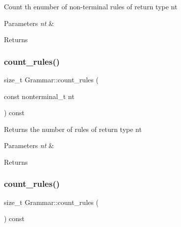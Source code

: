 Count th enumber of non-\/terminal rules of return type nt 
\begin{DoxyParams}{Parameters}
{\em nt} & \\
\hline
\end{DoxyParams}
\begin{DoxyReturn}{Returns}

\end{DoxyReturn}
\mbox{\label{class_grammar_af25c47a2c5cae2a11720c8454e59290f}} 
\subsubsection{\texorpdfstring{count\+\_\+rules()}{count\_rules()}\hspace{0.1cm}{\footnotesize\ttfamily [1/2]}}
{\footnotesize\ttfamily size\+\_\+t Grammar\+::count\+\_\+rules (\begin{DoxyParamCaption}\item[{const nonterminal\+\_\+t}]{nt }\end{DoxyParamCaption}) const\hspace{0.3cm}{\ttfamily [inline]}}

Returns the number of rules of return type nt 
\begin{DoxyParams}{Parameters}
{\em nt} & \\
\hline
\end{DoxyParams}
\begin{DoxyReturn}{Returns}

\end{DoxyReturn}
\mbox{\label{class_grammar_af8f0fdd9cb368a608bee5626774360d4}} 
\subsubsection{\texorpdfstring{count\+\_\+rules()}{count\_rules()}\hspace{0.1cm}{\footnotesize\ttfamily [2/2]}}
{\footnotesize\ttfamily size\+\_\+t Grammar\+::count\+\_\+rules (\begin{DoxyParamCaption}{ }\end{DoxyParamCaption}) const\hspace{0.3cm}{\ttfamily [inline]}}

